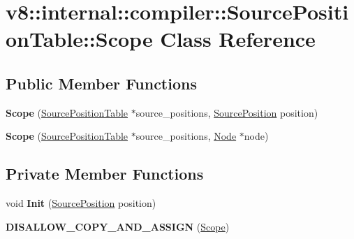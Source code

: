 \hypertarget{classv8_1_1internal_1_1compiler_1_1_source_position_table_1_1_scope}{}\section{v8\+:\+:internal\+:\+:compiler\+:\+:Source\+Position\+Table\+:\+:Scope Class Reference}
\label{classv8_1_1internal_1_1compiler_1_1_source_position_table_1_1_scope}
\subsection*{Public Member Functions}
\begin{DoxyCompactItemize}
\item 
{\bfseries Scope} (\hyperlink{classv8_1_1internal_1_1compiler_1_1_source_position_table}{Source\+Position\+Table} $\ast$source\+\_\+positions, \hyperlink{classv8_1_1internal_1_1compiler_1_1_source_position}{Source\+Position} position)\hypertarget{classv8_1_1internal_1_1compiler_1_1_source_position_table_1_1_scope_a4f4f13e36aca0b2a7ba0c01a189556de}{}\label{classv8_1_1internal_1_1compiler_1_1_source_position_table_1_1_scope_a4f4f13e36aca0b2a7ba0c01a189556de}

\item 
{\bfseries Scope} (\hyperlink{classv8_1_1internal_1_1compiler_1_1_source_position_table}{Source\+Position\+Table} $\ast$source\+\_\+positions, \hyperlink{classv8_1_1internal_1_1compiler_1_1_node}{Node} $\ast$node)\hypertarget{classv8_1_1internal_1_1compiler_1_1_source_position_table_1_1_scope_a9463054754362dca3e6654bb38c1f1d4}{}\label{classv8_1_1internal_1_1compiler_1_1_source_position_table_1_1_scope_a9463054754362dca3e6654bb38c1f1d4}

\end{DoxyCompactItemize}
\subsection*{Private Member Functions}
\begin{DoxyCompactItemize}
\item 
void {\bfseries Init} (\hyperlink{classv8_1_1internal_1_1compiler_1_1_source_position}{Source\+Position} position)\hypertarget{classv8_1_1internal_1_1compiler_1_1_source_position_table_1_1_scope_a2b5ef208624f0b7746a41029fb32af51}{}\label{classv8_1_1internal_1_1compiler_1_1_source_position_table_1_1_scope_a2b5ef208624f0b7746a41029fb32af51}

\item 
{\bfseries D\+I\+S\+A\+L\+L\+O\+W\+\_\+\+C\+O\+P\+Y\+\_\+\+A\+N\+D\+\_\+\+A\+S\+S\+I\+GN} (\hyperlink{classv8_1_1internal_1_1compiler_1_1_source_position_table_1_1_scope}{Scope})\hypertarget{classv8_1_1internal_1_1compiler_1_1_source_position_table_1_1_scope_a078a7cfe59b025d6c5b6eae16c2e4110}{}\label{classv8_1_1internal_1_1compiler_1_1_source_position_table_1_1_scope_a078a7cfe59b025d6c5b6eae16c2e4110}

\end{DoxyCompactItemize}
